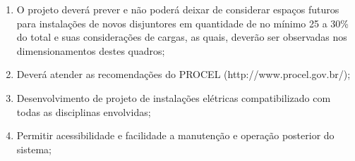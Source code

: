 \begin{enumerate}
	\item O projeto deverá prever e não poderá deixar de considerar espaços futuros para instalações de novos disjuntores em quantidade de no mínimo 25 a 30\% do total e suas considerações de cargas, as quais, deverão ser observadas nos dimensionamentos destes quadros; 
	
	\item Deverá atender as recomendações do PROCEL (http://www.procel.gov.br/);
	
	\item Desenvolvimento de projeto de instalações elétricas compatibilizado com todas as disciplinas envolvidas;
	
	\item Permitir acessibilidade e facilidade a manutenção e operação posterior do sistema;
\end{enumerate}